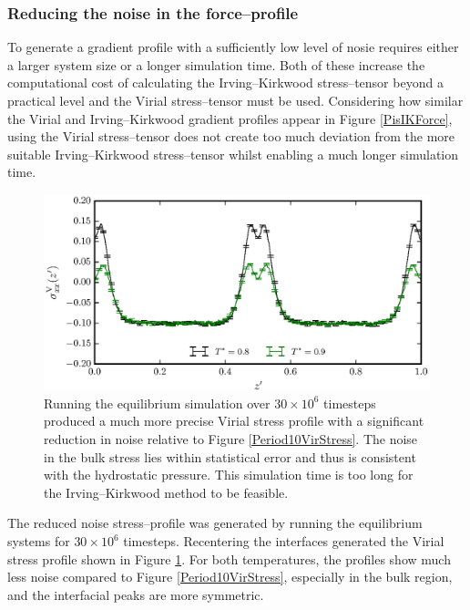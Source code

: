 \subsubsection{Reducing the noise in the force--profile}
To generate a gradient profile with a sufficiently low level of nosie requires either a larger system size or a longer simulation time.
Both of these increase the computational cost of calculating the Irving--Kirkwood stress--tensor beyond a practical level and the Virial stress--tensor must be used.
Considering how similar the Virial and Irving--Kirkwood gradient profiles appear in Figure \ref{PisIKForce}, using the Virial stress--tensor does not create too much deviation from the more suitable Irving--Kirkwood stress--tensor whilst enabling a much longer simulation time.
\FloatBarrier

\begin{figure}[h]
\centering
\includegraphics[scale=0.8]{Period30VirStress}
\caption{Running the equilibrium simulation over $30 \times 10^{6}$ timesteps produced a much more precise Virial stress profile with a significant reduction in noise relative to Figure \ref{Period10VirStress}.
The noise in the bulk stress lies within statistical error and thus is consistent with the hydrostatic pressure.
This simulation time is too long for the Irving--Kirkwood method to be feasible.
}
\label{Period30VirStress}
\end{figure}

The reduced noise stress--profile was generated by running the equilibrium systems for $30 \times 10^{6}$ timesteps.
Recentering the interfaces generated the Virial stress profile shown in Figure \ref{Period30VirStress}.
For both temperatures, the profiles show much less noise compared to Figure \ref{Period10VirStress}, especially in the bulk region, and the interfacial peaks are more symmetric.
\FloatBarrier

